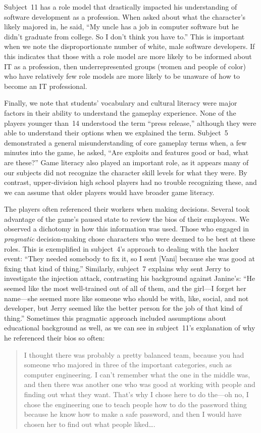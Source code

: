 \documentclass[letterpaper]{article}
\begin{document}
Subject~11 has a role model that drastically impacted his
understanding of software development as a profession. When asked
about what the character’s likely majored in, he said, ``My uncle has a
job in computer software but he didn’t graduate from college. So I
don’t think you have to.'' This is important when we note the
disproportionate number of white, male software developers. If this
indicates that those with a role model are more likely to be informed
about IT as a profession, then underrepresented groups (women and
people of color) who have relatively few role models are more likely
to be unaware of how to become an IT professional.

Finally, we note that students' vocabulary and cultural literacy
were major factors in their ability to understand the gameplay
experience.
None of the players younger than~14 understood the term ``press release,''
although they were able to understand their options when we explained
the term.
Subject~5 demonstrated a general misunderstanding of core
gameplay terms when, a few minutes into the game, he asked,
``Are exploits and features good or bad, what are these?''
Game literacy also played an important role, as it appears many of
our subjects did not recognize the character skill levels for what they were.
By contrast, upper-division high school players had no trouble recognizing
these, and we can assume that older players would have broader game literacy.



The players often referenced their workers when making decisions. Several
took advantage of the game's paused state to review the bios of their
employees. We observed a dichotomy in how this information was used.
Those who engaged in \textit{pragmatic} decision-making chose
characters who were deemed to be best at these roles. This is exemplified
in subject~4's approach to dealing with the hacker event:
``They needed somebody to fix it, so
I sent [Vani] because she was good at fixing that kind
of thing.'' Similarly, subject~7 explains why sent Jerry to investigate
the injection attack, contrasting his background against Janine's:
``He seemed like the most well-trained out of all of them,
and the girl---I forget her name---she seemed more like someone
who should be with, like, social, and not developer,
but Jerry seemed like the better person for the job of that kind of thing.''
Sometimes this pragmatic approach included assumptions about 
educational background as well, as we can see in subject~11's 
explanation of why he referenced their bios so often:
\begin{quote}
I thought there was probably a pretty balanced team, because you had
someone who majored in three of the important categories,
such as computer engineering.
I can't remember what the one in the middle was, and
then there was another one who was good at working with people and
finding out what they want. That's why I chose here to do the---oh no,
I chose the engineering one to teach people how to do the password thing because
he know how to make a safe password, and then I would have chosen her to
find out what people liked\ldots{}.
\end{quote}
\end{document}
